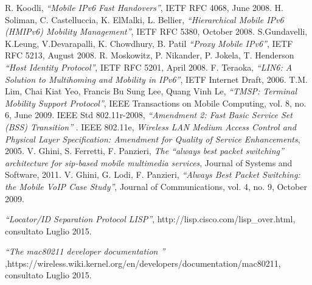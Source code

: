 \begin{thebibliography}{90}
 R. Koodli, \textit{``Mobile IPv6 Fast Handovers''}, IETF RFC 4068, June 2008.
  H. Soliman, C. Castelluccia, K. ElMalki, L. Bellier, \textit{``Hierarchical Mobile IPv6 (HMIPv6) Mobility Management''}, IETF RFC 5380, October 2008.
 S.Gundavelli, K.Leung, V.Devarapalli, K. Chowdhury, B. Patil \textit{``Proxy Mobile IPv6''}, IETF RFC 5213, August 2008.
 R. Moskowitz, P. Nikander, P. Jokela, T. Henderson \textit{``Host Identity Protocol''}, IETF RFC 5201, April 2008. 
 F. Teraoka, \textit{``LIN6: A Solution to Multihoming and Mobility in IPv6''}, IETF Internet Draft, 2006.
	T.M. Lim, Chai Kiat Yeo, Francis Bu Sung Lee, Quang Vinh Le, \textit{``TMSP: Terminal Mobility Support Protocol''}, IEEE Transactions on Mobile Computing, vol. 8, no. 6, June 2009.
 IEEE Std 802.11r-2008, \textit{``Amendment 2: Fast Basic Service Set (BSS) Transition''} .
 IEEE 802.11e, \textit{ Wireless LAN Medium Access Control and Physical Layer Specification: Amendment for Quality of Service Enhancements}, 2005.
 V. Ghini, S. Ferretti, F. Panzieri, \textit{The ``always best packet switching'' architecture for sip-based mobile multimedia services}, Journal of Systems and Software, 2011.
 V. Ghini, G. Lodi, F. Panzieri, \textit{``Always Best Packet Switching: the Mobile VoIP Case Study''}, Journal of Communications, vol. 4, no. 9, October 2009.

 \textit{``Locator/ID Separation Protocol LISP''}, http://lisp.cisco.com/lisp\_over.html, consultato Luglio 2015.

 \textit{``The  mac80211 developer documentation ''} ,https://wireless.wiki.kernel.org/en/developers/documentation/mac80211, consultato Luglio 2015.
\end{thebibliography}
